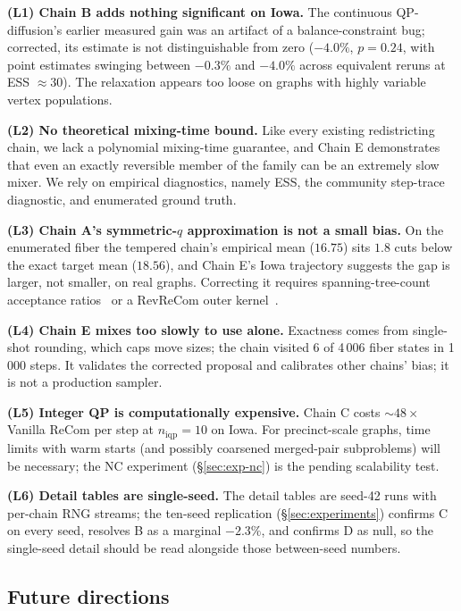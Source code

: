 \documentclass[11pt]{article}
\begin{document}
\textbf{(L1) Chain B adds nothing significant on Iowa.} The
continuous QP-diffusion's earlier measured gain was an artifact of a
balance-constraint bug; corrected, its estimate is not
distinguishable from zero ($-4.0\%$, $p = 0.24$, with point estimates
swinging between $-0.3\%$ and $-4.0\%$ across equivalent reruns at
ESS $\approx 30$). The relaxation appears too loose on graphs with
highly variable vertex populations.

\textbf{(L2) No theoretical mixing-time bound.} Like every existing
redistricting chain, we lack a polynomial mixing-time guarantee, and
Chain E demonstrates that even an exactly reversible member of the
family can be an extremely slow mixer. We rely on empirical
diagnostics, namely ESS, the community step-trace diagnostic, and enumerated
ground truth.

\textbf{(L3) Chain A's symmetric-$q$ approximation is not a small
bias.} On the enumerated fiber the tempered chain's empirical mean
($16.75$) sits $1.8$ cuts below the exact target mean ($18.56$), and
Chain E's Iowa trajectory suggests the gap is larger, not smaller, on
real graphs. Correcting it requires spanning-tree-count acceptance
ratios~\cite{autry2023metropolized} or a RevReCom outer
kernel~\cite{cannon2022spanning}.

\textbf{(L4) Chain E mixes too slowly to use alone.} Exactness comes
from single-shot rounding, which caps move sizes; the chain visited
6 of 4\,006 fiber states in 1\,000 steps. It validates the corrected
proposal and calibrates other chains' bias; it is not a production
sampler.

\textbf{(L5) Integer QP is computationally expensive.} Chain C costs
$\sim 48\times$ Vanilla ReCom per step at $n_{\mathrm{iqp}} = 10$ on
Iowa. For precinct-scale graphs, time limits with warm starts (and
possibly coarsened merged-pair subproblems) will be necessary; the
NC experiment (\S\ref{sec:exp-nc}) is the pending scalability test.

\textbf{(L6) Detail tables are single-seed.} The detail tables are
seed-42 runs with per-chain RNG streams; the ten-seed replication
(\S\ref{sec:experiments}) confirms C on every seed, resolves B as a
marginal $-2.3\%$, and confirms D as null, so the single-seed detail
should be read alongside those between-seed numbers.

\subsection{Future directions}\label{sec:disc-future}
\end{document}
